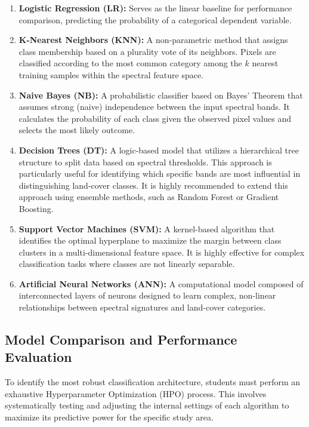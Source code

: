 \documentclass{article}
\begin{document}
\begin{enumerate}
    \item \textbf{Logistic Regression (LR):} Serves as the linear baseline for performance comparison, predicting the probability of a categorical dependent variable.

    \item \textbf{K-Nearest Neighbors (KNN):} A non-parametric method that assigns class membership based on a plurality vote of its neighbors. Pixels are classified according to the most common category among the $k$ nearest training samples within the spectral feature space.

    \item \textbf{Naive Bayes (NB):} A probabilistic classifier based on Bayes' Theorem that assumes strong (naive) independence between the input spectral bands. It calculates the probability of each class given the observed pixel values and selects the most likely outcome.

    \item \textbf{Decision Trees (DT):} A logic-based model that utilizes a hierarchical tree structure to split data based on spectral thresholds. This approach is particularly useful for identifying which specific bands are most influential in distinguishing land-cover classes. It is highly recommended to extend this approach using ensemble methods, such as Random Forest or Gradient Boosting.

    \item \textbf{Support Vector Machines (SVM):} A kernel-based algorithm that identifies the optimal hyperplane to maximize the margin between class clusters in a multi-dimensional feature space. It is highly effective for complex classification tasks where classes are not linearly separable.

    \item \textbf{Artificial Neural Networks (ANN):} A computational model composed of interconnected layers of neurons designed to learn complex, non-linear relationships between spectral signatures and land-cover categories.
\end{enumerate}

\subsection{Model Comparison and Performance Evaluation}
To identify the most robust classification architecture, students must perform an exhaustive Hyperparameter Optimization (HPO) process. This involves systematically testing and adjusting the internal settings of each algorithm to maximize its predictive power for the specific study area.
\end{document}
